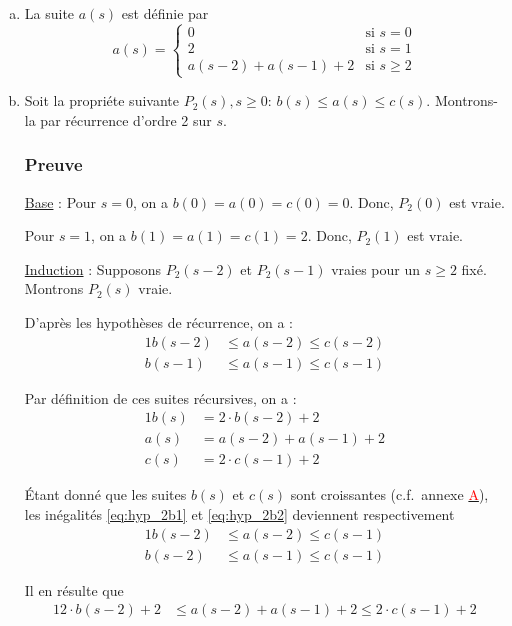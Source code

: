 \documentclass[12pt,a4paper]{article}
\begin{document}
\begin{enumerate}[a)]
\item La suite $a(s)$ est d\'efinie par
\[ a(s) = \begin{cases} 
      0 & \text{si } s = 0 \\
      2 & \text{si } s = 1 \\
      a(s-2) + a(s-1) + 2 & \text{si } s\geq 2 
   \end{cases}
\]

\item Soit la propri\'ete suivante $P_{2}(s), s\geq 0$: $ b(s) \leq a(s) \leq c(s) $.
Montrons-la par r\'ecurrence d'ordre 2 sur $s$. 

\subsubsection*{Preuve}
\underline{Base} : Pour \( s = 0\), on a $b(0) = a(0) = c(0) = 0 $. Donc, $P_{2}(0)$ est vraie.

Pour \( s = 1\), on a $b(1) = a(1) = c(1) = 2 $. Donc, $P_{2}(1)$ est vraie.

\medskip
\underline{Induction} : Supposons \( P_{2}(s-2) \) et \( P_{2}(s-1) \) vraies pour un \( s \geq 2 \) fix\'e. Montrons \( P_{2}(s) \) vraie.

D'apr\`es les hypoth\`eses de r\'ecurrence, on a : 
\begin{alignat}{1}
b(s-2) &\leq a(s-2) \leq c(s-2) \label{eq:hyp_2b1}\\
b(s-1) &\leq a(s-1) \leq c(s-1) \label{eq:hyp_2b2}
\end{alignat} 

Par d\'efinition de ces suites r\'ecursives, on a :
\begin{alignat}{1}
b(s) &= 2\cdot b(s-2) + 2 \label{eq:def_2b1}\\
a(s) &= a(s-2) + a(s-1) + 2 \label{eq:def_2b2}\\
c(s) &= 2\cdot c(s-1) + 2 \label{eq:def_2b3}
\end{alignat}

\'Etant donn\'e que les suites $b(s)$ et $c(s)$ sont croissantes (c.f.\ annexe \hyperref[appendix:suites]{\textcolor{red}{A}}), les in\'egalit\'es \eqref{eq:hyp_2b1} et \eqref{eq:hyp_2b2} deviennent respectivement
\begin{alignat*}{1}
b(s-2) &\leq a(s-2) \leq c(s-1) \\
b(s-2) &\leq a(s-1) \leq c(s-1)
\end{alignat*}

Il en r\'esulte que 
\begin{alignat}{1}
2\cdot b(s-2) + 2 &\leq a(s-2) + a(s-1) + 2 \leq 2\cdot c(s-1) + 2 \label{eq:ineg_2b}
\end{alignat}


\end{enumerate}
\end{document}
